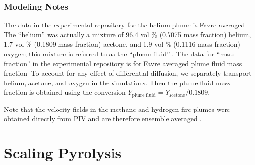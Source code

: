 \subsubsection{Modeling Notes}

The data in the experimental repository for the helium plume is Favre averaged.  The ``helium'' was actually a mixture of 96.4 vol \% (0.7075 mass fraction) helium, 1.7 vol \% (0.1809 mass fraction) acetone, and 1.9 vol \% (0.1116 mass fraction) oxygen; this mixture is referred to as the ``plume fluid'' \cite{OHern:2005}.  The data for ``mass fraction'' in the experimental repository is for Favre averaged plume fluid mass fraction.  To account for any effect of differential diffusion, we separately transport helium, acetone, and oxygen in the simulations.  Then the plume fluid mass fraction is obtained using the conversion $Y_{\mathrm{plume\;fluid}} = Y_{\mathrm{acetone}}/0.1809$.

Note that the velocity fields in the methane and hydrogen fire plumes were obtained directly from PIV and are therefore ensemble averaged \cite{Tieszen:2004,Tieszen:2002}.

\section{Scaling Pyrolysis}
\label{exp_Scaling Pyrolysis}

